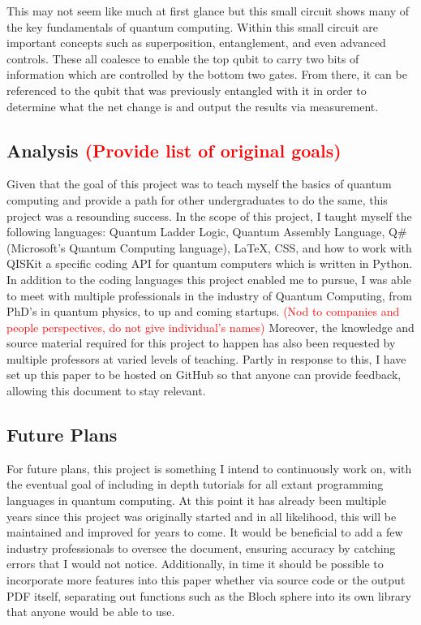 \documentclass[a4paper]{article}
\begin{document}
This may not seem like much at first glance but this small circuit shows many of the key fundamentals of quantum computing.  Within this small circuit are important concepts such as superposition, entanglement, and even advanced controls.  These all coalesce to enable the top qubit to carry two bits of information which are controlled by the bottom two gates. From there, it can be referenced to the qubit that was previously entangled with it in order to determine what the net change is and output the results via measurement.

\subsection{Analysis \textcolor{red}{(Provide list of original goals)}} %
Given that the goal of this project was to teach myself the basics of quantum computing and provide a path for other undergraduates to do the same, this project was a resounding success.  In the scope of this project, I taught myself the following languages: Quantum Ladder Logic, Quantum Assembly Language, Q\# (Microsoft's Quantum Computing language), LaTeX, CSS, and how to work with QISKit a specific coding API for quantum computers which is written in Python.\newline
\newline
In addition to the coding languages this project enabled me to pursue, I was able to meet with multiple professionals in the industry of Quantum Computing, from PhD's in quantum physics, to up and coming startups. \textcolor{red}{(Nod to companies and people perspectives, do not give individual's names)}  Moreover, the knowledge and source material required for this project to happen has also been requested by multiple professors at varied levels of teaching.  Partly in response to this, I have set up this paper to be hosted on GitHub so that anyone can provide feedback, allowing this document to stay relevant.

\subsection{Future Plans}
For future plans, this project is something I intend to continuously work on, with the eventual goal of including in depth tutorials for all extant programming languages in quantum computing.  At this point it has already been multiple years since this project was originally started and in all likelihood, this will be maintained and improved for years to come. It would be beneficial to add a few industry professionals to oversee the document, ensuring accuracy by catching errors that I would not notice.  Additionally, in time it should be possible to incorporate more features into this paper whether via source code or the output PDF itself, separating out functions such as the Bloch sphere into its own library that anyone would be able to use.
\end{document}
